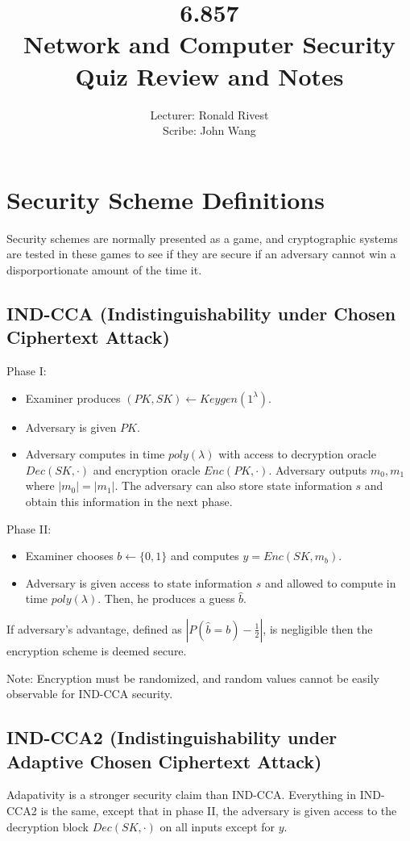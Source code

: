 \documentclass[psamsfonts]{amsart}
\title{6.857 \\
Network and Computer Security \\
Quiz Review and Notes}
\author{Lecturer: Ronald Rivest\\
Scribe: John Wang}
\begin{document}
\section{Security Scheme Definitions}

Security schemes are normally presented as a game, and cryptographic systems are tested in these games to see if they are secure if an adversary cannot win a disporportionate amount of the time it.

\subsection{IND-CCA (Indistinguishability under Chosen Ciphertext Attack)}

Phase I:
\begin{itemize}
  \item Examiner produces $(PK, SK) \leftarrow Keygen(1^\lambda)$.
  \item Adversary is given $PK$.
  \item Adversary computes in time $poly(\lambda)$ with access to decryption oracle $Dec(SK, \cdot)$ and encryption oracle $Enc(PK, \cdot)$. Adversary outputs $m_0, m_1$ where $|m_0| = |m_1|$. The adversary can also store state information $s$ and obtain this information in the next phase.
\end{itemize}

Phase II:
\begin{itemize}
  \item Examiner chooses $b \leftarrow \{0,1\}$ and computes $y = Enc(SK, m_b)$.
  \item Adversary is given access to state information $s$ and allowed to compute in time $poly(\lambda)$. Then, he produces a guess $\hat{b}$.
\end{itemize}

If adversary's advantage, defined as $|P(\hat{b} = b) - \frac{1}{2}|$, is negligible then the encryption scheme is deemed secure.

Note: Encryption must be randomized, and random values cannot be easily observable for IND-CCA security.

\subsection{IND-CCA2 (Indistinguishability under Adaptive Chosen Ciphertext Attack)}

Adapativity is a stronger security claim than IND-CCA. Everything in IND-CCA2 is the same, except that in phase II, the adversary is given access to the decryption block $Dec(SK, \cdot)$ on all inputs except for $y$.
\end{document}
